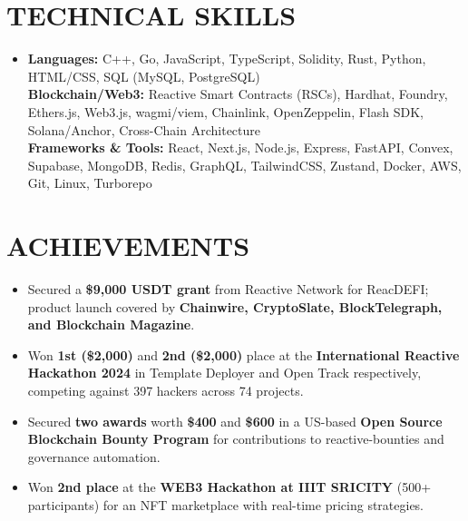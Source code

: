 \documentclass[letterpaper,10pt]{article}
\newcommand{\resumeItem}[1]{
  \item\small{
    {#1 \vspace{-2pt}}
  }
}
\newcommand{\resumeItemListStart}{\begin{itemize}}
\newcommand{\resumeItemListEnd}{\end{itemize}\vspace{-4pt}}
\begin{document}
\section{TECHNICAL SKILLS}
 \begin{itemize}[leftmargin=0.15in, label={}]
    \item{
     \textbf{Languages:}{ C++, Go, JavaScript, TypeScript, Solidity, Rust, Python, HTML/CSS, SQL (MySQL, PostgreSQL)} \\
     \textbf{Blockchain/Web3:}{ Reactive Smart Contracts (RSCs), Hardhat, Foundry, Ethers.js, Web3.js, wagmi/viem, Chainlink, OpenZeppelin, Flash SDK, Solana/Anchor, Cross-Chain Architecture} \\
     \textbf{Frameworks \& Tools:}{ React, Next.js, Node.js, Express, FastAPI, Convex, Supabase, MongoDB, Redis, GraphQL, TailwindCSS, Zustand, Docker, AWS, Git, Linux, Turborepo} \\
    }
 \end{itemize}

\section{ACHIEVEMENTS}
  \resumeItemListStart
      \resumeItem{Secured a \textbf{\$9,000 USDT grant} from Reactive Network for ReacDEFI; product launch covered by \textbf{Chainwire, CryptoSlate, BlockTelegraph, and Blockchain Magazine}.}
      \resumeItem{Won \textbf{1st (\$2,000)} and \textbf{2nd (\$2,000)} place at the \textbf{International Reactive Hackathon 2024} in Template Deployer and Open Track respectively, competing against 397 hackers across 74 projects.}
      \resumeItem{Secured \textbf{two awards} worth \textbf{\$400} and \textbf{\$600} in a US-based \textbf{Open Source Blockchain Bounty Program} for contributions to reactive-bounties and governance automation.}
      \resumeItem{Won \textbf{2nd place} at the \textbf{WEB3 Hackathon at IIIT SRICITY} (500+ participants) for an NFT marketplace with real-time pricing strategies.}
  \resumeItemListEnd
\end{document}
